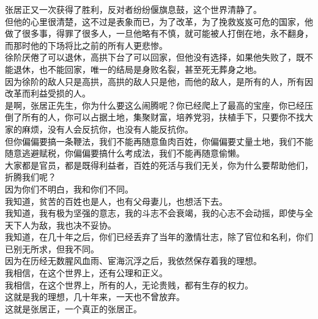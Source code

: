 \begin{multicols}{\theparacolNo}
张居正又一次获得了胜利，反对者纷纷偃旗息鼓，这个世界清静了。\\

但他的心里很清楚，这不过是表象而已，为了改革，为了挽救岌岌可危的国家，他做了很多事，得罪了很多人，一旦他略有不慎，就可能被人打倒在地，永不翻身，而那时他的下场将比之前的所有人更悲惨。\\

徐阶厌倦了可以退休，高拱下台了可以回家，但他没有选择，如果他失败了，既不能退休，也不能回家，唯一的结局是身败名裂，甚至死无葬身之地。\\

因为徐阶的敌人只是高拱，高拱的敌人只是他，而他的敌人，是所有的人，所有因改革而利益受损的人。\\

是啊，张居正先生，你为什么要这么闹腾呢？你已经爬上了最高的宝座，你已经压倒了所有的人，你可以占据土地，集聚财富，培养党羽，扶植手下，只要你不找大家的麻烦，没有人会反抗你，也没有人能反抗你。\\

但你偏偏要搞一条鞭法，我们不能再随意鱼肉百姓，你偏偏要丈量土地，我们不能随意逃避赋税，你偏偏要搞什么考成法，我们不能再随意偷懒。\\

大家都是官员，都是既得利益者，百姓的死活与我们无关，你为什么要帮助他们，折腾我们呢？\\

因为你们不明白，我和你们不同。\\

我知道，贫苦的百姓也是人，也有父母妻儿，也想活下去。\\

我知道，我有极为坚强的意志，我的斗志不会衰竭，我的心志不会动摇，即使与全天下人为敌，我也决不妥协。\\

我知道，在几十年之后，你们已经丢弃了当年的激情壮志，除了官位和名利，你们已别无所求，但我不同。\\

因为在历经无数腥风血雨、宦海沉浮之后，我依然保存着我的理想。\\

我相信，在这个世界上，还有公理和正义。\\

我相信，在这个世界上，所有的人，无论贵贱，都有生存的权力。\\

这就是我的理想，几十年来，一天也不曾放弃。\\

这就是张居正，一个真正的张居正。\\


\end{multicols}
